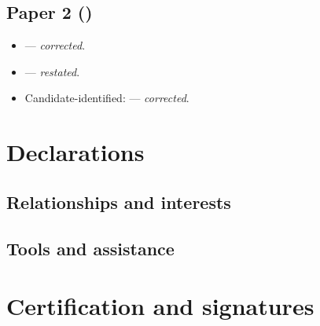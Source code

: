 \documentclass[11pt]{article}
\newcommand{\examinerRole}{Doctoral Examiner}
\newif\ifdraftnotes     \draftnotesfalse     %
\newcommand{\corrected}{\emph{corrected}}
\newcommand{\restated}{\emph{restated}}
\newcommand{\rev}[2]{\item #1 --- #2.}  %
\newcommand{\note}[1]{\ifdraftnotes\textcolor{red}{\small[\,#1\,]}\fi}
\begin{document}
\subsection*{Paper 2 (\note{short title})}
\begin{itemize}[leftmargin=1.6em,itemsep=0.15em]
\rev{\note{What changes, in one line}}{\corrected}
\rev{\note{What changes}}{\restated}
\rev{Candidate-identified: \note{what changes}}{\corrected}
\end{itemize}


\section{Declarations}\label{sec:declarations}

\subsection*{Relationships and interests}
\note{Any prior or current professional, collaborative, institutional,
financial or personal relationship between the \examinerRole, the technical
examiner(s), the candidate, and the Institute; any dual role in the
examination; and how each was managed.}

\subsection*{Tools and assistance}
\note{Software, computational tools and AI systems used in preparing the
technical examinations or this report, the parts of the record they bear on,
and how their output was independently checked.}

\section{Certification and signatures}\label{sec:signatures}
\end{document}
